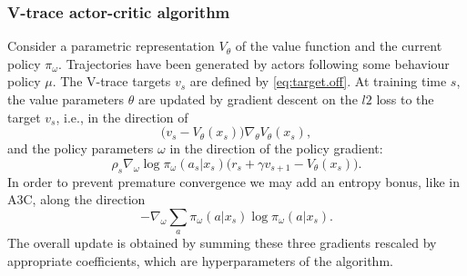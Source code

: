 \subsubsection*{V-trace actor-critic algorithm}
Consider a parametric representation $V_{\theta}$ of the value function and the current policy $\pi_{\omega}$. Trajectories have been generated by actors following some behaviour policy $\mu$. The V-trace targets $v_s$ are defined by \eqref{eq:target.off}. At training time $s$, the value parameters $\theta$ are updated by gradient descent on the $l2$ loss to the target $v_s$, i.e., in the direction of
$$\big( v_s - V_\theta(x_s)\big) \nabla_\theta V_\theta(x_s),$$
and the policy parameters $\omega$ in the direction of the policy gradient:
$$ \rho_s \nabla_\omega\log\pi_\omega(a_s|x_s) \big( r_s+\gamma v_{s+1} - V_\theta(x_s)\big).
$$
In order to prevent premature convergence we may add an entropy bonus, like in A3C, along the direction
$$-\nabla_\omega \sum_a \pi_\omega(a|x_s) \log\pi_\omega(a|x_s).$$
The overall update is obtained by summing these three gradients rescaled by appropriate coefficients, which are hyperparameters of the algorithm.







